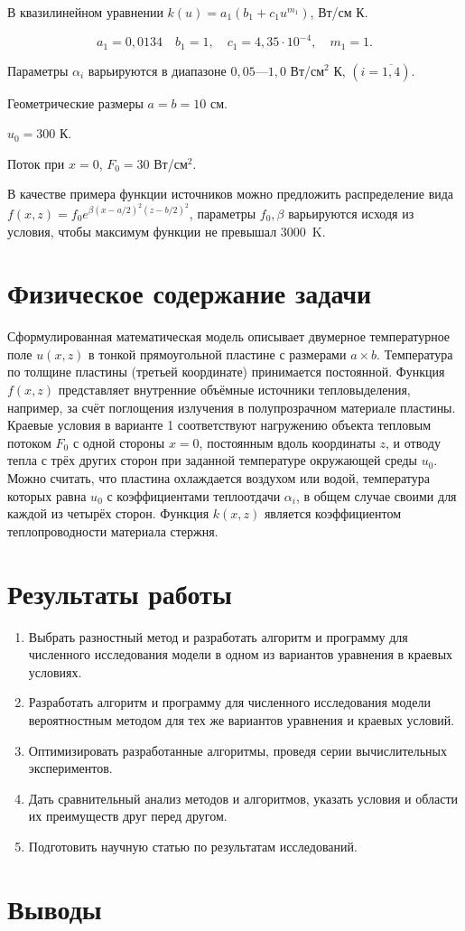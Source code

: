 В квазилинейном уравнении $k(u) = a_1(b_1 + c_1u^{m_1})$, Вт/см К.

\begin{equation}
	a_1 = 0,0134 \quad b_1 = 1, \quad c_1 = 4,35 \cdot 10^{-4}, \quad m_1 = 1.
\end{equation}

Параметры $\alpha_i$ варьируются в диапазоне $0,05$—$1,0$ Вт/см$^2$ К, $(i = \overline{1,4})$.

Геометрические размеры $a = b = 10$ см.

$u_0 = 300$ К.

Поток при $x = 0$, $F_0 = 30$ Вт/см$^2$.

В качестве примера функции источников можно предложить распределение вида $f(x, z) = f_0 e^{\beta(x - a/2)^2(z - b/2)^2}$, параметры $f_0, \beta$ варьируются исходя из условия, чтобы максимум функции не превышал $3000$~K.

\section{Физическое содержание задачи}

Сформулированная математическая модель описывает двумерное температурное поле $u(x, z)$ в тонкой прямоугольной пластине с размерами $a \times b$.
Температура по толщине пластины (третьей координате) принимается постоянной.
Функция $f(x, z)$ представляет внутренние объёмные источники тепловыделения, например, за счёт поглощения излучения в полупрозрачном материале пластины.
Краевые условия в варианте 1 соответствуют нагружению объекта тепловым потоком $F_0$ с одной стороны $x = 0$, постоянным вдоль координаты $z$, и отводу тепла с трёх других сторон при заданной температуре окружающей среды $u_0$.
Можно считать, что пластина охлаждается воздухом или водой, температура которых равна $u_0$ с коэффициентами теплоотдачи $\alpha_i$, в общем случае своими для каждой из четырёх сторон.
Функция $k(x, z)$ является коэффициентом теплопроводности материала стержня.

\section{Результаты работы}

\begin{enumerate}
	\item Выбрать разностный метод и разработать алгоритм и программу для численного исследования модели в одном из вариантов уравнения в краевых условиях.
	\item Разработать алгоритм и программу для численного исследования модели вероятностным методом для тех же вариантов уравнения и краевых условий.
	\item Оптимизировать разработанные алгоритмы, проведя серии вычислительных экспериментов.
	\item Дать сравнительный анализ методов и алгоритмов, указать условия и области их преимуществ друг перед другом.
	\item Подготовить научную статью по результатам исследований.
\end{enumerate}


\section{Выводы}
